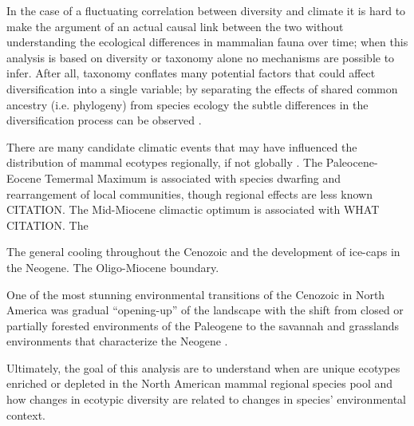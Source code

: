 \documentclass[12pt,letterpaper]{article}
\begin{document}
In the case of a fluctuating correlation between diversity and climate it is hard to make the argument of an actual causal link between the two without understanding the ecological differences in mammalian fauna over time; when this analysis is based on diversity or taxonomy alone no mechanisms are possible to infer. After all, taxonomy conflates many potential factors that could affect diversification into a single variable; by separating the effects of shared common ancestry (i.e. phylogeny) from species ecology the subtle differences in the diversification process can be observed \citep{Smits2015b}.

There are many candidate climatic events that may have influenced the distribution of mammal ecotypes regionally, if not globally \citep{Zachos2001,Zachos2008,Janis1993a,Blois2009}. The Paleocene-Eocene Temermal Maximum is associated with species dwarfing and rearrangement of local communities, though regional effects are less known CITATION. The Mid-Miocene climactic optimum is associated with WHAT CITATION. The 

The general cooling throughout the Cenozoic and the development of ice-caps in the Neogene. The Oligo-Miocene boundary. 

One of the most stunning environmental transitions of the Cenozoic in North America was gradual ``opening-up'' of the landscape with the shift from closed or partially forested environments of the Paleogene to the savannah and grasslands environments that characterize the Neogene \citep{Blois2009,Janis1993a,Janis2000,Stromberg2005}.











Ultimately, the goal of this analysis are to understand when are unique ecotypes enriched or depleted in the North American mammal regional species pool and how changes in ecotypic diversity are related to changes in species' environmental context.
\end{document}
